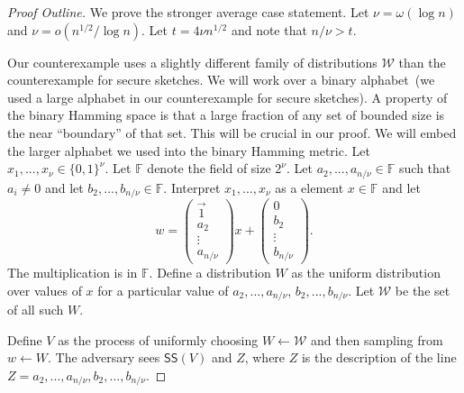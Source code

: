 \documentclass[11pt]{article}
\newcommand{\class}[1]{{\ensuremath{\mathsf{#1}}}}
\newcommand{\sketch}{\ensuremath{\class{SS}}\xspace}
\newcommand{\zo}{\ensuremath{\{0, 1\}}}
\begin{document}
\begin{proof}[Proof Outline]
We prove the stronger average case statement.
Let $\nu = \omega(\log n)$ and $\nu = o(n^{1/2}/\log n)$.  Let $t=4\nu n^{1/2}$ and note that $n/\nu >t$.  

Our counterexample uses a slightly different family of distributions $\mathcal{W}$ than the counterexample for secure sketches.  
We will work over a binary alphabet~(we used a large alphabet in our counterexample for secure sketches).  A  property of the binary Hamming space is that a large fraction of any set of bounded size is the near ``boundary'' of that set.  This will be crucial in our proof.  We will embed the larger alphabet we used into the binary Hamming metric.
Let $x_1,..., x_\nu \in \zo^\nu$.  Let $\mathbb{F}$ denote the field of size $2^{\nu}$.  Let $a_2,..., a_{n/\nu}\in\mathbb{F}$ such that $a_i\neq 0$ and let $b_2,..., b_{n/\nu}\in\mathbb{F}$.  
Interpret $x_1,..., x_{\nu}$ as a element $x\in \mathbb{F}$ and let 
\[w =  \begin{pmatrix} \vec{1} \\a_2  \\ \vdots \\ a_{n/\nu} \end{pmatrix} x + \begin{pmatrix} 0  \\ 
b_2\\ \vdots \\ b_{n/\nu} \end{pmatrix} .
\]
The multiplication is in $\mathbb{F}$.
Define a distribution $W$ as the uniform distribution over values of $x$ for a particular value of $a_2,..., a_{n/\nu}$, $b_2,..., b_{n/\nu}$.  
Let $\mathcal{W}$ be the set of all such $W$.  

 Define $V$ as the process of uniformly choosing $W\leftarrow \mathcal{W}$ and then sampling from $w\leftarrow W$.  The adversary sees $\sketch(V)$  and $Z$, where $Z$ is the description of the line $Z = a_2,..., a_{n/\nu}, b_2, ..., b_{n/\nu}$.
 

\end{proof}
\end{document}
